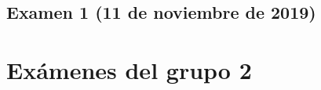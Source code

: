 \documentclass[a4paper,12pt,twoside]{book}
\begin{document}
\section{Examen 1 (11 de noviembre de 2019)}
        
\chapter{Exámenes del grupo 2}
\end{document}

